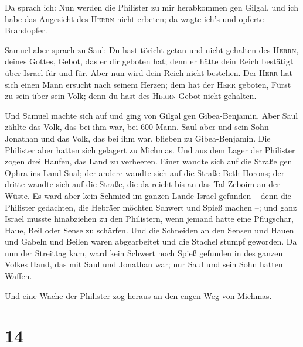  Da sprach ich: Nun werden die Philister zu mir
herabkommen gen Gilgal, und ich habe das Angesicht des \textsc{Herrn}
nicht erbeten; da wagte ich's und opferte Brandopfer.

 Samuel aber sprach zu Saul: Du hast töricht getan und
nicht gehalten des \textsc{Herrn}, deines Gottes, Gebot, das er dir
geboten hat; denn er hätte dein Reich bestätigt über Israel für und für.
 Aber nun wird dein Reich nicht bestehen. Der
\textsc{Herr} hat sich einen Mann ersucht nach seinem Herzen; dem hat
der \textsc{Herr} geboten, Fürst zu sein über sein Volk; denn du hast
des \textsc{Herrn} Gebot nicht gehalten.

 Und Samuel machte sich auf und ging von Gilgal gen
Gibea-Benjamin. Aber Saul zählte das Volk, das bei ihm war, bei 600
Mann.  Saul aber und sein Sohn Jonathan und das Volk, das
bei ihm war, blieben zu Gibea-Benjamin. Die Philister aber hatten sich
gelagert zu Michmas.  Und aus dem Lager der Philister
zogen drei Haufen, das Land zu verheeren. Einer wandte sich auf die
Straße gen Ophra ins Land Sual;  der andere wandte sich
auf die Straße Beth-Horons; der dritte wandte sich auf die Straße, die
da reicht bis an das Tal Zeboim an der Wüste.  Es ward
aber kein Schmied im ganzen Lande Israel gefunden -- denn die Philister
gedachten, die Hebräer möchten Schwert und Spieß machen --;
 und ganz Israel musste hinabziehen zu den Philistern,
wenn jemand hatte eine Pflugschar, Haue, Beil oder Sense zu schärfen.
 Und die Schneiden an den Sensen und Hauen und Gabeln und
Beilen waren abgearbeitet und die Stachel stumpf geworden.
 Da nun der Streittag kam, ward kein Schwert noch Spieß
gefunden in des ganzen Volkes Hand, das mit Saul und Jonathan war; nur
Saul und sein Sohn hatten Waffen.

 Und eine Wache der Philister zog heraus an den engen Weg
von Michmas.

\hypertarget{section-13}{%
\section{14}\label{section-13}}

